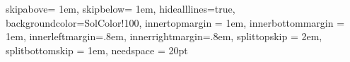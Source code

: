 \usepackage{xcolor}
\usepackage{amsthm}
\usepackage{thmtools}
\usepackage[framemethod=tikz]{mdframed}


 {
  skipabove= 1em,
  skipbelow= 1em,
  hidealllines=true,
  backgroundcolor={SolColor!100},
  innertopmargin = 1em,
  innerbottommargin = 1em,
  innerleftmargin=.8em,
  innerrightmargin=.8em,
  splittopskip = 2em,
  splitbottomskip = 1em,
  needspace = 20pt}

\newenvironment{solbox}
  {\begin{mdframed}[style = mystyle]}
  {\end{mdframed}}

 